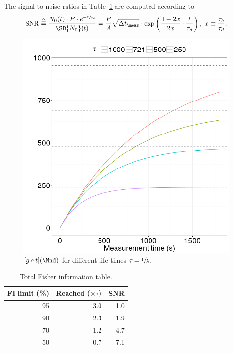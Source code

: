 \documentclass{article}
\newcommand{\dt}{\Delta t}
\newcommand{\dtm}{\dt_{\meas}}
\newcommand{\LTb}{\tau_b}
\newcommand{\LTd}{\tau_d}
\begin{document}
\newcommand{\SNR}{\text{SNR}}
\newcommand{\deq}{\overset{\triangle}{=}}
The signal-to-noise ratios in Table~\ref{tbl:FItot} are computed according to
\begin{equation}\label{eq:TauRatioSNR}
\SNR \deq \frac{N_0(t)\cdot P\cdot e^{-\sfrac{t}{\LTd}}}{\SD{N_0}(t)} 
= \frac{P}{A}\sqrt{\dtm}\cdot\exp\bkt{\frac{1-2x}{2x}\cdot\frac{t}{\LTd}},~ x\equiv \frac{\LTb}{\LTd}.
\end{equation}
\begin{figure}[h]
	\centering
	\includegraphics[scale=.5]{img/StatReq/XtotOnTime}
	\caption{$[g\circ t](\Nnd)$ for different life-times $\tau = \sfrac1\lambda$.\label{fig:GofT}}
\end{figure}
\begin{table}[h]
	\centering
	\caption{Total Fisher information table.\label{tbl:FItot}}
	\begin{tabular}{rrr}
		\hline
		FI limit (\%) & Reached ($\times\tau$) & SNR \\ \hline
		           95 &                    3.0 & 1.0 \\
		           90 &                    2.3 & 1.9 \\
		           70 &                    1.2 & 4.7 \\
		           50 &                    0.7 & 7.1 \\ \hline
	\end{tabular}
\end{table}
\end{document}
